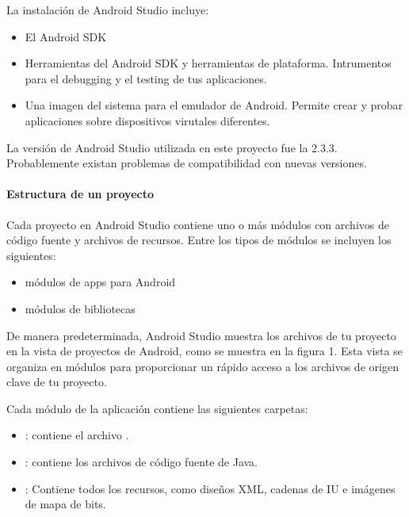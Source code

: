 La instalación de Android Studio incluye:
\begin{itemize}
\item {} 
El Android SDK

\item {} 
Herramientas del Android SDK y herramientas de plataforma. Intrumentos para el debugging y el testing de tus aplicaciones.

\item {} 
Una imagen del sistema para el emulador de Android. Permite crear y probar aplicaciones sobre dispositivos virutales diferentes.

\end{itemize}

La versión de Android Studio utilizada en este proyecto fue la 2.3.3. Probablemente
existan problemas de compatibilidad con nuevas versiones.


\paragraph{Estructura de un proyecto}
\label{\detokenize{dev_docs:estructura-de-un-proyecto}}
Cada proyecto en Android Studio contiene uno o más módulos con archivos de código fuente y archivos de recursos. Entre los tipos de módulos se incluyen los siguientes:
\begin{itemize}
\item {} 
módulos de apps para Android

\item {} 
módulos de bibliotecas


\end{itemize}

De manera predeterminada, Android Studio muestra los archivos de tu proyecto en la vista de proyectos de Android, como se muestra en la figura 1. Esta vista se organiza en módulos para proporcionar un rápido acceso a los archivos de origen clave de tu proyecto.

Cada módulo de la aplicación contiene las siguientes carpetas:
\begin{itemize}
\item {} 
: contiene el archivo .

\item {} 
: contiene los archivos de código fuente de Java.

\item {} 
: Contiene todos los recursos, como diseños XML, cadenas de IU e imágenes de mapa de bits.

\end{itemize}

